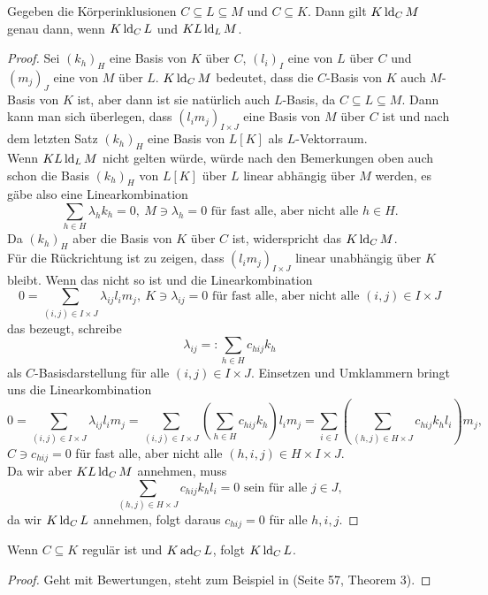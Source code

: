     \begin{lemma}\label{Stapellemma}
    	Gegeben die Körperinklusionen $C\subseteq L\subseteq M$ und $C\subseteq K$. Dann gilt $K\operatorname{ld}_CM$ genau dann, wenn $K\operatorname{ld}_CL$ und $KL\operatorname{ld}_LM$.
    \end{lemma}
    \begin{proof}
    	Sei $(k_h)_H$ eine Basis von $K$ über $C$, $(l_i)_I$ eine von $L$ über $C$ und $(m_j)_J$ eine von $M$ über $L$. $K\operatorname{ld}_CM$ bedeutet, dass die $C$-Basis von $K$ auch $M$-Basis von $K$ ist, aber dann ist sie natürlich auch $L$-Basis, da $C\subseteq L\subseteq M$. Dann kann man sich überlegen, dass $(l_im_j)_{I\times J}$ eine Basis von $M$ über $C$ ist und nach dem letzten Satz $(k_h)_H$ eine Basis von $L[K]$ als $L$-Vektorraum.\\
    	Wenn $KL\operatorname{ld}_LM$ nicht gelten würde, würde nach den Bemerkungen oben auch schon die Basis $(k_h)_H$ von $L[K]$ über $L$ linear abhängig über $M$ werden, es gäbe also eine Linearkombination $$\sum\limits_{h\in H}\lambda_hk_h=0,\ M\ni\lambda_h=0\text{ für fast alle, aber nicht alle } h\in H.$$
    	Da $(k_h)_H$ aber die Basis von $K$ über $C$ ist, widerspricht das $K\operatorname{ld}_CM$.\\
    	Für die Rückrichtung ist zu zeigen, dass $(l_im_j)_{I\times J}$ linear unabhängig über $K$ bleibt. Wenn das nicht so ist und die Linearkombination $$0=\sum\limits_{(i,j)\in I\times J}\lambda_{ij}l_im_j,\  K\ni\lambda_{ij}=0\text{ für fast alle, aber nicht alle } (i,j)\in I\times J$$ das bezeugt, schreibe $$\lambda_{ij}=:\sum\limits_{h\in H}c_{hij}k_h$$ als $C$-Basisdarstellung für alle $(i,j)\in I\times J$. Einsetzen und Umklammern bringt uns die Linearkombination $$0=\sum\limits_{(i,j)\in I\times J}\lambda_{ij}l_im_j=\sum\limits_{(i,j)\in I\times J}(\sum\limits_{h\in H} c_{hij}k_h)l_im_j=\sum\limits_{i\in I}(\sum\limits_{(h,j)\in H\times J}c_{hij}k_hl_i)m_j,$$ $C\ni c_{hij}=0$ für fast alle, aber nicht alle $(h,i,j)\in H\times I\times J$.\\
    	Da wir aber $KL\operatorname{ld}_CM$ annehmen, muss $$\sum\limits_{(h,j)\in H\times J}c_{hij}k_hl_i=0\text{ sein für alle }j\in J,$$ da wir $K\operatorname{ld}_CL$ annehmen, folgt daraus $c_{hij}=0$ für alle $h,i,j$.
    \end{proof}
    
    \begin{lemma}\label{Das komplizierte Lemma}
    	Wenn $C\subseteq K$ regulär ist und $K\operatorname{ad}_CL$, folgt $K\operatorname{ld}_CL$.
    \end{lemma}
    \begin{proof}
    	Geht mit Bewertungen, steht zum Beispiel in \cite{SergeLang} (Seite 57, Theorem 3).
    \end{proof}
    
